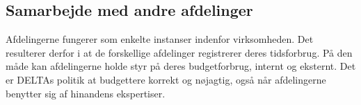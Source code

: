 \subsection{Samarbejde med andre afdelinger}
Afdelingerne fungerer som enkelte instanser indenfor virksomheden.
Det resulterer derfor i at de forskellige afdelinger registrerer deres tidsforbrug. På den måde kan afdelingerne holde styr på deres budgetforbrug, internt og eksternt. Det er DELTAs politik at budgettere korrekt og nøjagtig, også når afdelingerne benytter sig af hinandens ekspertiser.  





